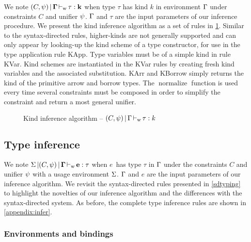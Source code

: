 We note $(C,\mathrm{\psi}) \operatorname{|} \bf{\Gamma} \operatorname{\vdash_w} \bf{\tau} : k$ when type $\tau$ has kind $k$
in environment $\Gamma$ under constraints $C$ and unifier $\mathrm{\psi}$.
$\Gamma$ and $\tau$ are the input parameters of
our inference procedure.
We present the kind inference algorithm as a set of rules in
\cref{rules:kinding}.
Similar to the syntax-directed rules, higher-kinds are not generally supported
and can only appear by looking-up the kind scheme of a type constructor,
for use in the type application rule {\sc KApp}.
Type variables must be of a simple kind in rule {\sc KVar}.
Kind schemes are instantiated in the {\sc KVar} rules by creating
fresh kind variables and the associated substitution.
{\sc KArr} and {\sc KBorrow} simply returns the kind of the primitive
arrow and borrow types.
The $\operatorname{normalize}$ function is used every time several constraints
must be composed in order to simplify the constraint and return a most general
unifier.

\begin{figure}[ht]
  \centering
  
  \caption{Kind inference algorithm -- $(C,\mathrm{\psi}) \operatorname{|} \Gamma \operatorname{\vdash_w} \tau : k$}
  \label{rules:kinding}
\end{figure}



\subsection{Type inference}

We note $\Sigma \operatorname{|} (C,\mathrm{\psi}) \operatorname{|} \bf{\Gamma} \operatorname{\vdash_w} \bf{e} : \tau$ when
$e$\ has type $\tau$ in $\Gamma$ under the constraints $C$ and unifier $\mathrm{\psi}$
with a usage environment $\Sigma$. $\Gamma$ and $e$ are the input parameters of our
inference algorithm.
We revisit the syntax-directed rules presented in \cref{sdtyping} to highlight the
novelties
of our inference algorithm and the differences with the syntax-directed
system.
As before, the complete type inference rules are shown in \cref{appendix:infer}.

\subsubsection{Environments and bindings}
\label{infer:envs}

